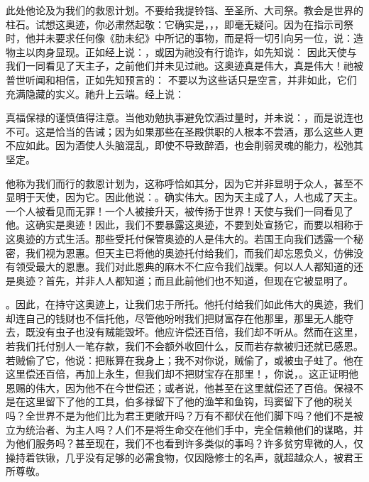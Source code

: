 此处他论及为我们的救恩计划。不要给我提铃铛、至圣所、大司祭。教会是世界的柱石。试想这奥迹，你必肃然起敬：它确实是，，，即毫无疑问。因为在指示司祭时，他并未要求任何像《肋未纪》中所记的事物，而是将一切引向另一位，说：造物主以肉身显现。正如经上说：，或因为祂没有行诡诈，如先知说：  因此天使与我们一同看见了天主子，之前他们并未见过祂。这奥迹真是伟大，真是伟大！祂被普世听闻和相信，正如先知预言的：  不要以为这些话只是空言，并非如此，它们充满隐藏的实义。祂升上云端。经上说： \par

真福保禄的谨慎值得注意。当他劝勉执事避免饮酒过量时，并未说：，而是说连也不可。这是恰当的告诫；因为如果那些在圣殿供职的人根本不尝酒，那么这些人更不应如此。因为酒使人头脑混乱，即使不导致醉酒，也会削弱灵魂的能力，松弛其坚定。\par

他称为我们而行的救恩计划为，这称呼恰如其分，因为它并非显明于众人，甚至不显明于天使，因为它。因此他说：。确实伟大。因为天主成了人，人也成了天主。一个人被看见而无罪！一个人被接升天，被传扬于世界！天使与我们一同看见了他。这确实是奥迹！因此，我们不要暴露这奥迹，不要到处宣扬它，而要以相称于这奥迹的方式生活。那些受托付保管奥迹的人是伟大的。若国王向我们透露一个秘密，我们视为恩惠。但天主已将他的奥迹托付给我们，而我们却忘恩负义，仿佛没有领受最大的恩惠。我们对此恩典的麻木不仁应令我们战栗。何以人人都知道的还是奥迹？首先，并非人人都知道；而且此前他们也不知道，但现在它被显明了。\par

。因此，在持守这奥迹上，让我们忠于所托。他托付给我们如此伟大的奥迹，我们却连自己的钱财也不信托他，尽管他吩咐我们把财富存在他那里，那里无人能夺去，既没有虫子也没有贼能毁坏。他应许偿还百倍，我们却不听从。然而在这里，若我们托付别人一笔存款，我们不会额外收回什么，反而若存款被归还就已感恩。若贼偷了它，他说：把账算在我身上；我不对你说，贼偷了，或被虫子蛀了。他在这里偿还百倍，再加上永生，但我们却不把财宝存在那里！，你说，。这正证明他恩赐的伟大，因为他不在今世偿还；或者说，他甚至在这里就偿还了百倍。保禄不是在这里留下了他的工具，伯多禄留下了他的渔竿和鱼钩，玛窦留下了他的税关吗？全世界不是为他们比为君王更敞开吗？万有不都伏在他们脚下吗？他们不是被立为统治者、为主人吗？人们不是将生命交在他们手中，完全信赖他们的谋略，并为他们服务吗？甚至现在，我们不也看到许多类似的事吗？许多贫穷卑微的人，仅操持着铁锹，几乎没有足够的必需食物，仅因隐修士的名声，就超越众人，被君王所尊敬。\par

